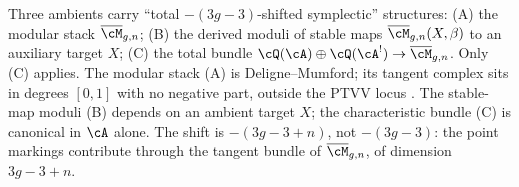 \begin{remark}
\label{rem:theoremC-ambient-identification}
Three ambients carry ``total $-(3g{-}3)$-shifted symplectic''
structures: (A) the modular stack $\overline{\cM}_{g,n}$;
(B) the derived moduli of stable maps
$\overline{\cM}_{g,n}(X, \beta)$ to an auxiliary target $X$;
(C) the total bundle
$\cQ(\cA) \oplus \cQ(\cA^!) \to \overline{\cM}_{g,n}$. Only (C)
applies. The modular stack (A) is Deligne--Mumford; its tangent
complex sits in degrees $[0,1]$ with no negative part, outside the
PTVV locus \cite[Rem.~2.7]{PTVV13}. The stable-map moduli (B)
depends on an ambient target $X$; the characteristic bundle (C) is
canonical in $\cA$ alone. The shift is $-(3g{-}3{+}n)$, not
$-(3g{-}3)$: the point markings contribute through the tangent
bundle of $\overline{\cM}_{g,n}$, of dimension $3g-3+n$.
\end{remark}

